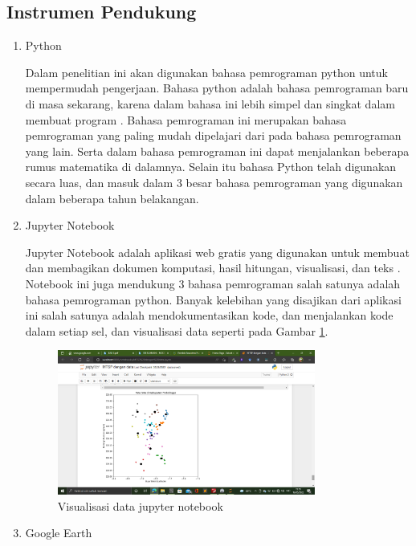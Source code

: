\subsection{Instrumen Pendukung}
\begin{enumerate}
    \item Python
    
    Dalam penelitian ini akan digunakan bahasa pemrograman python untuk mempermudah pengerjaan. Bahasa python adalah bahasa pemrograman baru di masa sekarang, karena dalam bahasa ini lebih simpel dan singkat dalam membuat program \cite{syahrudin2018input}. Bahasa pemrograman ini merupakan bahasa pemrograman yang paling mudah dipelajari dari pada bahasa pemrograman yang lain. Serta dalam bahasa pemrograman ini dapat menjalankan beberapa rumus matematika di dalamnya. Selain itu bahasa Python telah digunakan secara luas, dan masuk dalam 3 besar bahasa pemrograman yang digunakan dalam beberapa tahun belakangan.
    
    \item Jupyter Notebook
    
    Jupyter Notebook adalah aplikasi web gratis yang digunakan untuk membuat dan membagikan dokumen komputasi, hasil hitungan, visualisasi, dan teks \cite{Kluyver2016jupyter}. Notebook ini juga mendukung 3 bahasa pemrograman salah satunya adalah bahasa pemrograman python. Banyak kelebihan yang disajikan dari aplikasi ini salah satunya adalah mendokumentasikan kode, dan menjalankan kode dalam setiap sel, dan visualisasi data seperti pada Gambar \ref{fig:visjupyter}.

\begin{figure}[H]
  \centering
  \includegraphics[width=0.8\textwidth]{Gambar/visualisasi jupyter.png}
  \caption{Visualisasi data jupyter notebook}
  \label{fig:visjupyter}
\end{figure}

	\item Google Earth
	

\end{enumerate}
